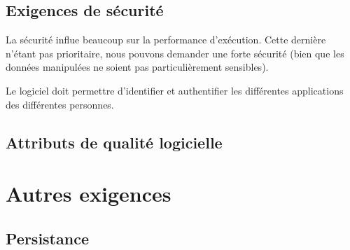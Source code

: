 	\subsection{Exigences de sécurité}

La sécurité influe beaucoup sur la performance d'exécution. Cette dernière n'étant pas prioritaire, nous pouvons demander une forte sécurité (bien que les données manipulées ne soient pas particulièrement sensibles).

\begin{requirement}[Identification]
	Le logiciel doit permettre d'identifier et authentifier les différentes applications des différentes personnes.
\end{requirement}

\subsection{Attributs de qualité logicielle}
	

\section{Autres exigences}

\subsection{Persistance}

